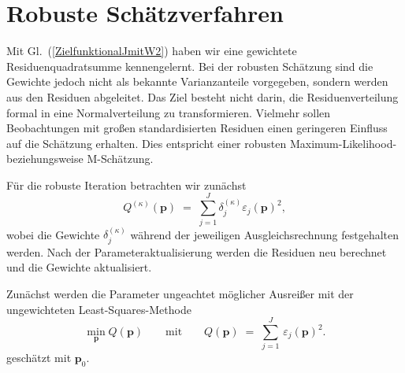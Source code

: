 \section{Robuste Schätzverfahren}
\label{robustEstimation}
Mit Gl.~(\ref{ZielfunktionalJmitW2}) haben wir eine gewichtete
Residuenquadratsumme kennengelernt. Bei der robusten Schätzung sind die Gewichte
jedoch nicht als bekannte Varianzanteile vorgegeben, sondern werden aus den
Residuen abgeleitet. Das Ziel besteht nicht darin, die Residuenverteilung
formal in eine Normalverteilung zu transformieren. Vielmehr sollen Beobachtungen
mit großen standardisierten Residuen einen geringeren Einfluss auf die Schätzung
erhalten. Dies entspricht einer robusten Maximum-Likelihood- beziehungsweise
M-Schätzung.

Für die robuste Iteration betrachten wir zunächst
\begin{equation}
Q^{(\kappa)}(\mathbf{p}) \; = \;
\sum_{j=1}^J \delta_j^{(\kappa)}
\varepsilon_j(\mathbf{p})^2 ,
\label{robustEstim}
\end{equation}
wobei die Gewichte $\delta_j^{(\kappa)}$ während der jeweiligen
Ausgleichsrechnung festgehalten werden. Nach der Parameteraktualisierung werden
die Residuen neu berechnet und die Gewichte aktualisiert.

Zunächst werden die Parameter ungeachtet möglicher Ausreißer mit der
ungewichteten Least-Squares-Methode
\begin{equation}
 \min_{\mathbf{p}} Q(\mathbf{p}) \qquad \mathrm{mit} \qquad
Q(\mathbf{p}) \; = \; \sum_{j=1}^J \, \varepsilon_j(\mathbf{p})^2 .
\label{linEstim}
\end{equation}
geschätzt mit $\mathbf{p}_0$.

